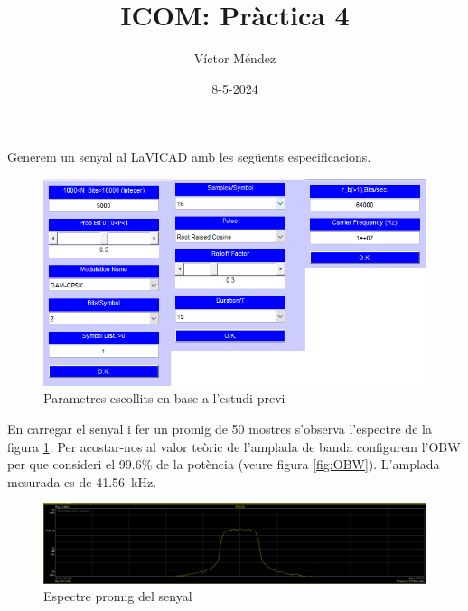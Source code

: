 \documentclass[catalan, a4paper, nobib]{tufte-handout}
\author{Víctor Méndez}
\title{ICOM: Pràctica 4}
\date{8-5-2024}
\begin{document}
\maketitle


Generem un senyal al LaVICAD amb les següents especificacions.

\begin{figure}[!h]
    \begin{center}
        \includegraphics[width=450px]{p1.png}
    \end{center}
    \caption{Parametres escollits en base a l'estudi previ}
\end{figure}


En carregar el senyal i fer un promig de \num{50} mostres s'observa l'espectre de la figura \ref{fig:SPECTRUM}. Per acostar-nos al valor teòric de l'amplada de banda configurem l'OBW per que consideri el \num{99.6}\% de la potència (veure figura \ref{fig:OBW}). L'amplada mesurada es de \qty{41.56}{\kilo\hertz}.

\begin{figure}
    \begin{center}
        \includegraphics[width=450px]{p2_1.png}
    \end{center}
    \caption{Espectre promig del senyal}
    \label{fig:SPECTRUM}
\end{figure}
\end{document}
